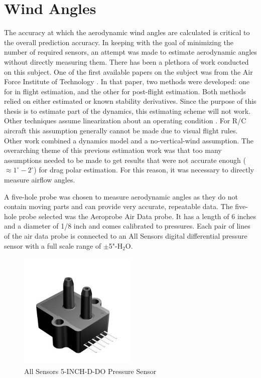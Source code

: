 \section{Wind Angles}
The accuracy at which the aerodynamic wind angles are calculated is critical to the overall prediction accuracy. In keeping with the goal of minimizing the number of required sensors, an attempt was made to estimate aerodynamic angles without directly measuring them. There has been a plethora of work conducted on this subject. One of the first available papers on the subject was from the Air Force Institute of Technology \cite{joseph1988}. In that paper, two methods were developed: one for in flight estimation, and the other for post-flight estimation. Both methods relied on either estimated or known stability derivatives. Since the purpose of this thesis is to estimate part of the dynamics, this estimating scheme will not work. Other techniques assume linearization about an operating condition \cite{morelli2012real}. For R/C aircraft this assumption generally cannot be made due to visual flight rules. Other work \cite{Lie2013} combined a dynamics model and a no-vertical-wind assumption. The overarching theme of this previous estimation work was that too many assumptions needed to be made to get results that were not accurate enough ($\approx1^\circ-2^\circ$) for drag polar estimation. For this reason, it was necessary to directly measure airflow angles.

\indent
A five-hole probe was chosen to measure aerodynamic angles as they do not contain moving parts and can provide very accurate, repeatable data. The five-hole probe selected was the Aeroprobe Air Data probe. It has a length of 6 inches and a diameter of 1/8 inch and comes calibrated to pressures. Each pair of lines of the air data probe is connected to an All Sensors digital differential pressure sensor with a full scale range of $\pm$5"-H$_2$O\cite{allsensorsDDO}.

\begin{figure}[H]
  \caption{All Sensors 5-INCH-D-DO Pressure Sensor} \label{allsensorsPressurePic}
  \centering
    \includegraphics[width=0.5\textwidth]{figures/allsensorsPressure.jpg}
\end{figure}

